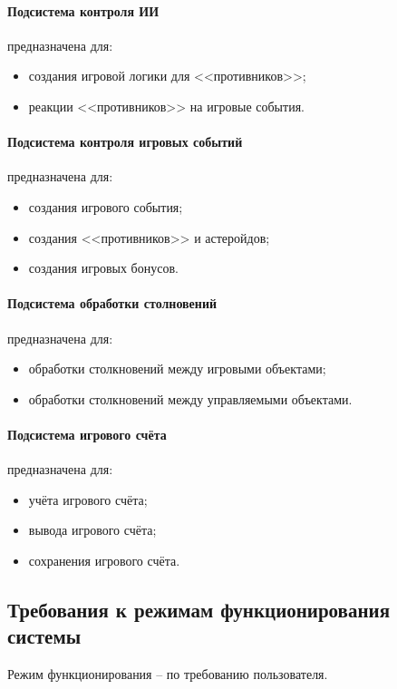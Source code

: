 \paragraph{Подсистема контроля ИИ}
предназначена для:
\begin{itemize}
    \item создания игровой логики для <<противников>>;
    \item реакции <<противников>> на игровые события.
\end{itemize}

\paragraph{Подсистема контроля игровых событий}
предназначена для:
\begin{itemize}
    \item создания игрового события;
    \item создания <<противников>> и астеройдов;
    \item создания игровых бонусов.
\end{itemize}

\paragraph{Подсистема обработки столновений}
предназначена для:
\begin{itemize}
    \item обработки столкновений между игровыми объектами;
    \item обработки столкновений между управляемыми объектами.
\end{itemize}

\paragraph{Подсистема игрового счёта}
предназначена для:
\begin{itemize}
    \item учёта игрового счёта;
    \item вывода игрового счёта;
    \item сохранения игрового счёта.
\end{itemize}

\subsection{Требования к режимам функционирования системы}
Режим функционирования -- по требованию пользователя.

